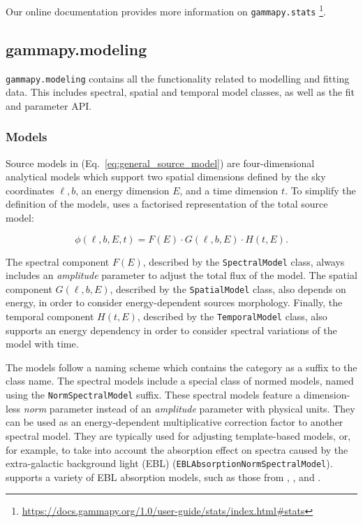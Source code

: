 \documentclass[longauth]{aa}
\newcommand{\code}[1]{\texttt{#1}}
\begin{document}
Our online documentation provides more information on \code{gammapy.stats}
\footnote{\url{https://docs.gammapy.org/1.0/user-guide/stats/index.html\#stats}}. 


\subsection{gammapy.modeling}
\label{ssec:gammapy-modeling}
%
\code{gammapy.modeling} contains all the functionality related to modelling and fitting
data. This includes spectral, spatial and temporal model classes, as well as
the fit and parameter API.

\subsubsection{Models}
\label{sssec:models}
Source models in \gammapy (Eq.~\ref{eq:general_source_model}) are four-dimensional 
analytical models which support two spatial dimensions defined by the sky coordinates
$\ell, b$, an energy dimension $E$, and a time dimension $t$. To simplify the definition of the
models, \gammapy uses a factorised representation of the total source
model:

\begin{equation}
    \phi(\ell, b, E, t) = F(E) \cdot G(\ell, b, E) \cdot H(t, E).
    \label{eq:source_model_dependency}
\end{equation}

The spectral component $F(E)$, described by the \code{SpectralModel} class, always
includes an \textit{amplitude} parameter to adjust the total flux of the model.
The spatial component $G(\ell, b, E)$, described by the \code{SpatialModel} class,
also depends on energy, in order to consider energy-dependent sources morphology.
Finally, the temporal component $H(t, E)$, described by the \code{TemporalModel}
class, also supports an energy dependency in order to consider spectral variations
of the model with time.

The models follow a naming scheme which contains the category as a suffix to
the class name. The spectral models include a special class of normed models,
named using the \code{NormSpectralModel} suffix.
These spectral models feature a dimension-less \textit{norm} parameter
instead of an \textit{amplitude} parameter with physical units. They
can be used as an energy-dependent multiplicative correction
factor to another spectral model. They are typically used for
adjusting template-based models, or, for example, to take into account
the absorption effect on \gammaray spectra caused by the extra-galactic background
light (EBL) (\code{EBLAbsorptionNormSpectralModel}). \gammapy supports a variety
of EBL absorption models, such as those from \cite{Franceschini2008, Franceschini2017}, \cite{Finke2010},
and \cite{Dominguez2011}.
\end{document}
